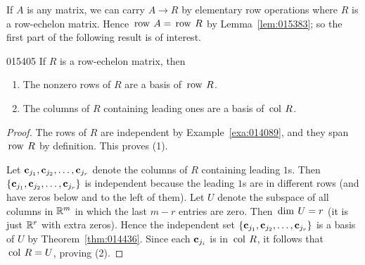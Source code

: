 If $A$ is any matrix, we can carry $A \to R$ by elementary row operations where $R$ is a row-echelon matrix. Hence $\thinspace\operatorname{row\medspace} A = \thinspace\operatorname{row\medspace} R$ by Lemma~\ref{lem:015383}; so the first part of the following result is of interest.

\begin{lemma}{}{015405}
If $R$ is a row-echelon matrix, then

\begin{enumerate}
\item The nonzero rows of $R$ are a basis of $\thinspace\operatorname{row\medspace} R$.

\item The columns of $R$ containing leading ones are a basis of $\thinspace\operatorname{col\medspace} R$.

\end{enumerate}
\end{lemma}

\begin{proof}
The rows of $R$ are independent by Example~\ref{exa:014089}, and they span $\thinspace\operatorname{row\medspace} R$ by definition. This proves (1).

Let $\textbf{c}_{j_{1}}, \textbf{c}_{j_{2}}, \dots, \textbf{c}_{j_{r}}$ denote the columns of $R$ containing leading $1$s. Then $\{\textbf{c}_{j_{1}}, \textbf{c}_{j_{2}}, \dots, \textbf{c}_{j_{r}}\}$ is independent because the leading $1$s are in different rows (and have zeros below and to the left of them). Let $U$ denote the subspace of all columns in $\mathbb{R}^m$ in which the last $m - r$ entries are zero. Then $\thinspace\operatorname{dim\medspace}U = r$ (it is just $\mathbb{R}^r$ with extra zeros). Hence the independent set $\{\textbf{c}_{j_{1}}, \textbf{c}_{j_{2}}, \dots, \textbf{c}_{j_{r}}\}$ is a basis of $U$ by Theorem~\ref{thm:014436}. Since each $\textbf{c}_{j_{i}}$ is in $\thinspace\operatorname{col\medspace} R$, it follows that $\thinspace\operatorname{col\medspace} R = U$, proving (2).
\end{proof}

